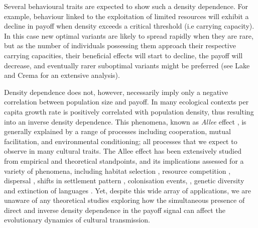 \documentclass[review,authoryear]{elsarticle}
\begin{document}
Several behavioural traits are expected to show such a density dependence. For example, behaviour linked to the exploitation of limited resources will exhibit a decline in payoff when density exceeds a critical threshold (i.e carrying capacity). In this case new optimal variants are likely to spread rapidly when they are rare, but as the number of individuals possessing them approach their respective carrying capacities, their beneficial effects will start to decline, the payoff will decrease, and eventually rarer suboptimal variants might be preferred (see Lake and Crema \citeyear{lake_and_crema_2012} for an extensive analysis). 

Density dependence does not, however, necessarily imply only a negative correlation between population size and payoff. In many ecological contexts per capita growth rate is positively correlated with population density, thus resulting into an inverse density dependence. This phenomena, known as \emph{Allee} effect \citep{allee1958,courchamp_etal_1999}, is generally explained by a range of processes including cooperation, mutual facilitation, and environmental conditioning; all processes that we expect to observe  in many cultural traits. The Allee effect has been extensively studied  from  empirical and theoretical standpoints, and its implications assessed for a variety of phenomena, including habitat selection \citep{greene_and_stamps_2001}, resource competition \citep{jang2013},  dispersal \citep{steele_2009}, shifts in settlement pattern \citep{crema_2014}, colonisation events,  \citep{kennet_etal_2006}, genetic diversity \citep{roques_etal_2012} and extinction of languages \citep{sutherland_2003} . Yet, despite this wide array of applications, we are unaware of any theoretical studies exploring how the simultaneous presence of direct and inverse density dependence in the payoff signal can affect the evolutionary dynamics of cultural transmission.   
\end{document}

